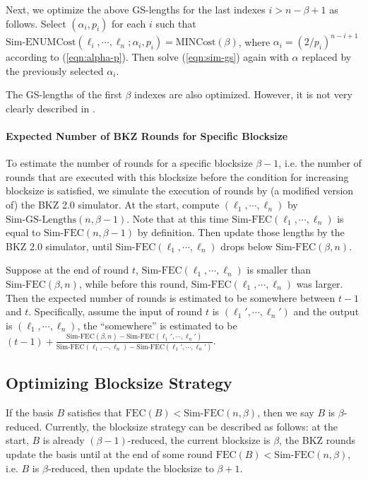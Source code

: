\documentclass[11pt]{article}
\newcommand{\MINCost}{\mathrm{MINCost}}
\newcommand{\SimENUMCost}{\mathrm{Sim}\text{-}\mathrm{ENUMCost}}
\newcommand{\SimGSLengths}{\mathrm{Sim}\text{-}\mathrm{GS}\text{-}\mathrm{Lengths}}
\newcommand{\SimFEC}{\mathrm{Sim}\text{-}\mathrm{FEC}}
\begin{document}
Next, we optimize the above GS-lengths for the last indexes $i>n-\beta+1$ as follows.
Select $(\alpha_i,p_i)$ for each $i$ such that $\SimENUMCost(\ell_i,\cdots,\ell_n;\alpha_i,p_i)=\MINCost(\beta)$, where $\alpha_i=(2/p_i)^{n-i+1}$ according to (\ref{eqn:alpha-p}).
Then solve (\ref{eqn:sim-gs}) again with $\alpha$ replaced by the previously selected $\alpha_i$.

The GS-lengths of the first $\beta$ indexes are also optimized.
However, it is not very clearly described in \cite{awht2016improved}.


\paragraph{Expected Number of BKZ Rounds for Specific Blocksize}

To estimate the number of rounds for a specific blocksize $\beta-1$, i.e. the number of rounds that are executed with this blocksize before the condition for increasing blocksize is satisfied, we simulate the execution of rounds by (a modified version of) the BKZ 2.0 simulator.
At the start, compute $(\ell_1,\cdots,\ell_n)$ by $\SimGSLengths(n,\beta-1)$.
Note that at this time $\SimFEC(\ell_1,\cdots,\ell_n)$ is equal to $\SimFEC(n,\beta-1)$ by definition.
Then update those lengths by the BKZ 2.0 simulator, until $\SimFEC(\ell_1,\cdots,\ell_n)$ drops below $\SimFEC(\beta,n)$.

Suppose at the end of round $t$, $\SimFEC(\ell_1,\cdots,\ell_n)$ is smaller than $\SimFEC(\beta,n)$, while before this round, $\SimFEC(\ell_1,\cdots,\ell_n)$ was larger.
Then the expected number of rounds is estimated to be somewhere between $t-1$ and $t$.
Specifically, assume the input of round $t$ is $(\ell_1',\cdots,\ell_n')$ and the output is $(\ell_1,\cdots,\ell_n)$, the ``somewhere'' is estimated to be $(t-1)+\frac{\SimFEC(\beta,n)-\SimFEC(\ell_1',\cdots,\ell_n')}{\SimFEC(\ell_1,\cdots,\ell_n)-\SimFEC(\ell_1',\cdots,\ell_n')}$.

\subsection{Optimizing Blocksize Strategy}

If the basis $B$ satisfies that $\mathrm{FEC}(B)<\SimFEC(n,\beta)$, then we say $B$ is $\beta$-reduced.
Currently, the blocksize strategy can be described as follows: at the start, $B$ is already $(\beta-1)$-reduced, the current blocksize is $\beta$, the BKZ rounds update the basis until at the end of some round $\mathrm{FEC}(B)<\SimFEC(n,\beta)$, i.e. $B$ is $\beta$-reduced, then update the blocksize to $\beta+1$.
\end{document}
